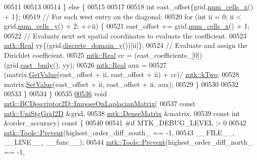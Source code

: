 \begin{DoxyCode}
00511 
00513 
00514   \} \textcolor{keywordflow}{else} \{
00515 
00517 
00518     \textcolor{keywordtype}{int} east\_offset\{grid.\hyperlink{classmtk_1_1UniStgGrid2D_a2d182866a398aba8e4829590e85bf939}{num\_cells\_x}() + 1\};
00519     \textcolor{comment}{// For each west entry on the diagonal:}
00520     \textcolor{keywordflow}{for} (\textcolor{keywordtype}{int} ii = 0; ii < grid.\hyperlink{classmtk_1_1UniStgGrid2D_aed05a801cc9a76dba0ff203cea58a61a}{num\_cells\_y}() + 2; ++ii) \{
00521       east\_offset += grid.\hyperlink{classmtk_1_1UniStgGrid2D_a2d182866a398aba8e4829590e85bf939}{num\_cells\_x}() + 1;
00522       \textcolor{comment}{// Evaluate next set spatial coordinates to evaluate the coefficient.}
00523       \hyperlink{group__c01-roots_gac080bbbf5cbb5502c9f00405f894857d}{mtk::Real} yy\{(grid.\hyperlink{classmtk_1_1UniStgGrid2D_ac33a58d65105550dcf6f6b92b48b5105}{discrete\_domain\_y}())[ii]\};
00524       \textcolor{comment}{// Evaluate and assign the Dirichlet coefficient.}
00525       \hyperlink{group__c01-roots_gac080bbbf5cbb5502c9f00405f894857d}{mtk::Real} cc = (east\_coefficients\_[0])(grid.\hyperlink{classmtk_1_1UniStgGrid2D_a03f689eb29a6369b82ce1207c655d5ff}{east\_bndy}(), yy);
00526       \hyperlink{group__c01-roots_gac080bbbf5cbb5502c9f00405f894857d}{mtk::Real} aux =
00527         (matrix.\hyperlink{classmtk_1_1DenseMatrix_a4b23ecbebd970b5eea915dbb50691024}{GetValue}(east\_offset + ii, east\_offset + ii) + cc)/
      \hyperlink{group__c01-roots_gaf39c2d851a2db744f4feb1c5ab3ec2cf}{mtk::kTwo};
00528       matrix.\hyperlink{classmtk_1_1DenseMatrix_a784ce5784109ac86bfb9d8562b334b13}{SetValue}(east\_offset + ii, east\_offset + ii, aux);
00529     \}
00530 
00532 
00533   \}
00534 \}
00535 
\hypertarget{mtk__bc__descriptor__2d_8cc_source_l00536}{}\hyperlink{classmtk_1_1BCDescriptor2D_a35592617dda3b965b680b2a1355122f4}{00536} \textcolor{keywordtype}{void} \hyperlink{classmtk_1_1BCDescriptor2D_a35592617dda3b965b680b2a1355122f4}{mtk::BCDescriptor2D::ImposeOnLaplacianMatrix}(
00537     \textcolor{keyword}{const} \hyperlink{classmtk_1_1UniStgGrid2D}{mtk::UniStgGrid2D} &grid,
00538     \hyperlink{classmtk_1_1DenseMatrix}{mtk::DenseMatrix} &matrix,
00539     \textcolor{keyword}{const} \textcolor{keywordtype}{int} &order\_accuracy)\textcolor{keyword}{ const }\{
00540 
00541 \textcolor{preprocessor}{  #if MTK\_DEBUG\_LEVEL > 0}
00542   \hyperlink{classmtk_1_1Tools_a332324c6f25e66be9dff48c5987a3b9f}{mtk::Tools::Prevent}(highest\_order\_diff\_south\_ == -1,
00543                       \_\_FILE\_\_, \_\_LINE\_\_, \_\_func\_\_);
00544   \hyperlink{classmtk_1_1Tools_a332324c6f25e66be9dff48c5987a3b9f}{mtk::Tools::Prevent}(highest\_order\_diff\_north\_ == -1,

\end{DoxyCode}
